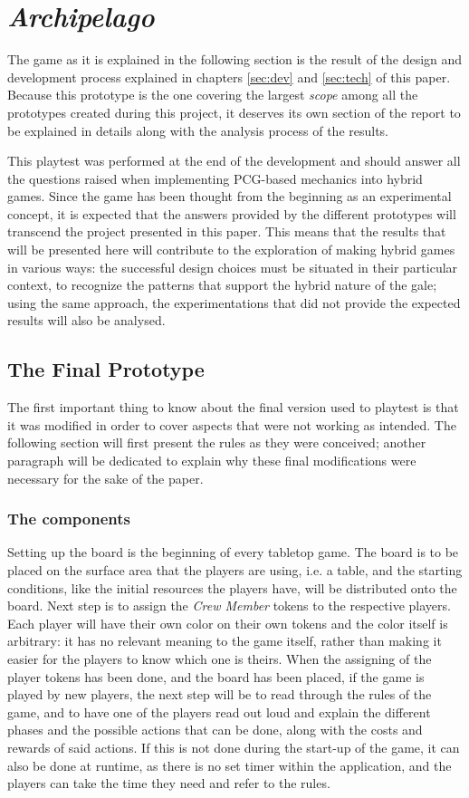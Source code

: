 \chapter{\textit{Archipelago}}
The game as it is explained in the following section is the result of the design and development process explained in chapters \ref{sec:dev} and \ref{sec:tech} of this paper. Because this prototype is the one covering the largest \textit{scope} among all the prototypes created during this project, it deserves its own section of the report to be explained in details along with the analysis process of the results.
 
This playtest was performed at the end of the development and should answer all the questions raised when implementing PCG-based mechanics into hybrid games. Since the game has been thought from the beginning as an experimental concept, it is expected that the answers provided by the different prototypes will transcend the project presented in this paper. This means that the results that will be presented here will contribute to the exploration of making hybrid games in various ways: the successful design choices must be situated in their particular context, to recognize the patterns that support the hybrid nature of the gale; using the same approach, the experimentations that did not provide the expected results will also be analysed.
\section{The Final Prototype}
\label{sec:finalproto}
The first important thing to know about the final version used to playtest is that it was modified in order to cover aspects that were not working as intended. The following section will first present the rules as they were conceived; another paragraph will be dedicated to explain why these final modifications were necessary for the sake of the paper.

\subsection{The components}
Setting up the board is the beginning of every tabletop game. The board is to be placed on the surface area that the players are using, i.e. a table, and the starting conditions, like the initial resources the players have, will be distributed onto the board. Next step is to assign the \textit{Crew Member} tokens to the respective players. Each player will have their own color on their own tokens and the color itself is arbitrary: it has no relevant meaning to the game itself, rather than making it easier for the players to know which one is theirs.
When the assigning of the player tokens has been done, and the board has been placed, if the game is played by new players, the next step will be to read through the rules of the game, and to have one of the players read out loud and explain the different phases and the possible actions that can be done, along with the costs and rewards of said actions. If this is not done during the start-up of the game, it can also be done at runtime, as there is no set timer within the application, and the players can take the time they need and refer to the rules.

